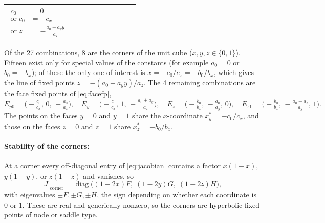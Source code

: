 \documentclass[10pt]{article}
\begin{document}
\begin{appendices}
\begin{table}
{\begin{tabular}{|r|c|c|c|c|c|c|c|c|c|}
$\begin{aligned} c_0&=0 \\ \text{or}\;c_0&=-c_x \\ \text{or}\;z&=-\tfrac{a_0+a_y y}{a_z} \end{aligned}$ \\ \hline
\end{tabular}}
\end{table}
Of the 27 combinations, 8 are the corners of the unit cube ($x,y,z\in\{0,1\}$). Fifteen exist only for special values of the constants (for example $a_0=0$ or $b_0=-b_x$); of these the only one of interest is $x=-c_0/c_x=-b_0/b_x$, which gives the line of fixed points $z=-(a_0+a_y y)/a_z$. The 4 remaining combinations are the face fixed points of \cref{eq:facefp},
\begin{equation*}
E_{y0}=\Big(-\tfrac{c_0}{c_x},\,0,\,-\tfrac{a_0}{a_z}\Big),\quad
E_y=\Big(-\tfrac{c_0}{c_x},\,1,\,-\tfrac{a_0+a_y}{a_z}\Big),\quad
E_z=\Big(-\tfrac{b_0}{b_x},\,-\tfrac{a_0}{a_y},\,0\Big),\quad
E_{z1}=\Big(-\tfrac{b_0}{b_x},\,-\tfrac{a_0+a_z}{a_y},\,1\Big).
\end{equation*}
The points on the faces $y=0$ and $y=1$ share the $x$-coordinate $x_y^*=-c_0/c_x$, and those on the faces $z=0$ and $z=1$ share $x_z^*=-b_0/b_x$.

\paragraph{Stability of the corners:} At a corner every off-diagonal entry of \cref{eq:jacobian} contains a factor $x(1-x)$, $y(1-y)$, or $z(1-z)$ and vanishes, so
\begin{equation*}
J\big|_{\text{corner}}=\operatorname{diag}\big((1-2x)F,\;(1-2y)G,\;(1-2z)H\big),
\end{equation*}
with eigenvalues $\pm F,\pm G,\pm H$, the sign depending on whether each coordinate is $0$ or $1$. These are real and generically nonzero, so the corners are hyperbolic fixed points of node or saddle type.


\end{appendices}
\end{document}
